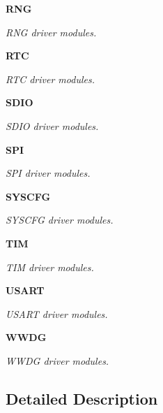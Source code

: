 \begin{DoxyCompactItemize}
\textbf{ R\+NG}
\begin{DoxyCompactList}\small\item\em R\+NG driver modules. \end{DoxyCompactList}\item 
\textbf{ R\+TC}
\begin{DoxyCompactList}\small\item\em R\+TC driver modules. \end{DoxyCompactList}\item 
\textbf{ S\+D\+IO}
\begin{DoxyCompactList}\small\item\em S\+D\+IO driver modules. \end{DoxyCompactList}\item 
\textbf{ S\+PI}
\begin{DoxyCompactList}\small\item\em S\+PI driver modules. \end{DoxyCompactList}\item 
\textbf{ S\+Y\+S\+C\+FG}
\begin{DoxyCompactList}\small\item\em S\+Y\+S\+C\+FG driver modules. \end{DoxyCompactList}\item 
\textbf{ T\+IM}
\begin{DoxyCompactList}\small\item\em T\+IM driver modules. \end{DoxyCompactList}\item 
\textbf{ U\+S\+A\+RT}
\begin{DoxyCompactList}\small\item\em U\+S\+A\+RT driver modules. \end{DoxyCompactList}\item 
\textbf{ W\+W\+DG}
\begin{DoxyCompactList}\small\item\em W\+W\+DG driver modules. \end{DoxyCompactList}\end{DoxyCompactItemize}


\subsection{Detailed Description}
